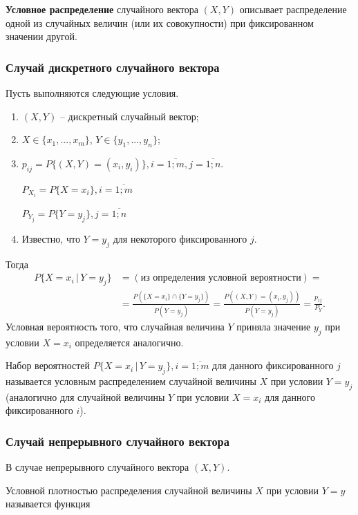 \textbf{Условное распределение} случайного вектора $(X, Y)$ описывает распределение одной из случайных величин (или их совокупности) при фиксированном значении другой.

\subsubsection*{Случай дискретного случайного вектора}

Пусть выполняются следующие условия.

\begin{enumerate}
	
	\item $(X,Y)$ -- дискретный случайный вектор;
	\item $X \in \{x_1, ..., x_m\}$, $Y \in \{y_1, ..., y_n\}$;
	\item $p_{ij} = P\{(X,Y) = (x_i, y_i)\}, i = \overline{1; m}, j = \overline{1; n}$.
	
	$P_{X_i} = P\{X = x_i\}, i = \overline{1; m}$
	
	$P_{Y_j} = P\{Y = y_j\}, j = \overline{1; n}$
	
	\item Известно, что $Y = y_j$ для некоторого фиксированного $j$.
\end{enumerate}
Тогда 
\begin{align*}
	P\{X = x_i \,|\, Y = y_j\} &= 
	\left( \text{из определения условной вероятности} \right) = \\
	&= \frac{P(\{X = x_i\} \cap \{Y = y_j\})}{P(Y = y_j)} = 
	\frac{P((X, Y) = (x_i, y_j))}{P(Y = y_j)} = 
	\frac{p_{ij}}{P_Y}.
\end{align*}
Условная вероятность того, что случайная величина $Y$ приняла значение $y_j$ при условии $X = x_i$ определяется аналогично.

Набор вероятностей $P\{X = x_i \,|\, Y = y_j\}, i = \overline{1; m}$ для данного фиксированного $j$ называется условным распределением случайной величины $X$ при условии $Y = y_j$ (аналогично для случайной величины $Y$ при условии $X = x_i$ для данного фиксированного $i$).

\subsubsection*{Случай непрерывного случайного вектора}

В случае непрерывного случайного вектора $(X, Y)$.

Условной плотностью распределения случайной величины $X$ при условии $Y = y$ называется функция

